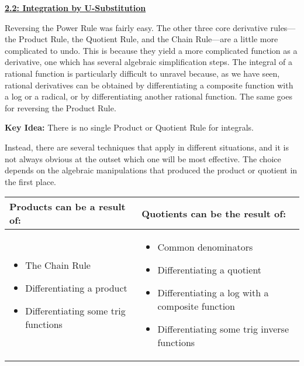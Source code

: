\textbf{\underline{\large{2.2: Integration by U-Substitution }}} \par

Reversing the Power Rule was fairly easy. The other three core derivative rules---the Product Rule, the Quotient Rule, and the Chain Rule---are a little more complicated to undo. This is because they yield a more complicated function as a derivative, one which has several algebraic simplification steps. The integral of a rational function is particularly difficult to unravel because, as we have seen, rational derivatives can be obtained by differentiating a composite function with a log or a radical, or by differentiating another rational function. The same goes for reversing the Product Rule. \par

\textbf{Key Idea:} There is no single Product or Quotient Rule for integrals. \par

Instead, there are several techniques that apply in different situations, and it is not always obvious at the outset which one will be most effective. The choice depends on the algebraic manipulations that produced the product or quotient in the first place. \par

\begin{center} %
    \begin{table}[h!]
        \centering
        \setlength{\extrarowheight}{2pt} %
        \begin{tabular}{|>{\raggedright\arraybackslash}p{}|
                        >{\raggedright\arraybackslash}p{}|}
        \hline
        \rowcolor{gray!20}\centering\textbf{Products can be a result of:} &
        \centering\textbf{Quotients can be the result of:} \tabularnewline
        \hline
        \begin{itemize}[leftmargin=*]
            \item The Chain Rule
            \item Differentiating a product
            \item Differentiating some trig functions
        \end{itemize}
        &
        \begin{itemize}[leftmargin=*]
            \item Common denominators
            \item Differentiating a quotient
            \item Differentiating a log with a composite function
            \item Differentiating some trig inverse functions
        \end{itemize}
        \tabularnewline
        \hline
        \end{tabular}
        \end{table}
\end{center}

